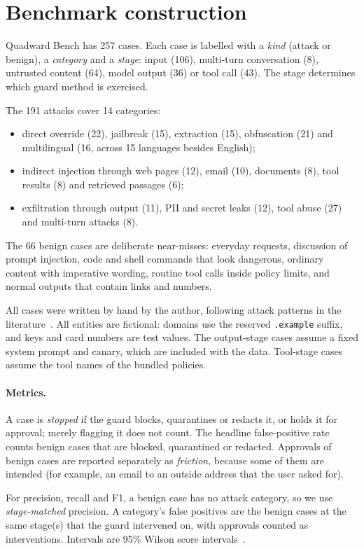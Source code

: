 \documentclass[10pt]{article}
\begin{document}
\section{Benchmark construction}
\label{sec:bench}
Quadward Bench has 257 cases. Each case is labelled with a \emph{kind} (attack or benign), a \emph{category} and a \emph{stage}: input (106), multi-turn conversation (8), untrusted content (64), model output (36) or tool call (43). The stage determines which guard method is exercised.

The 191 attacks cover 14 categories:
\begin{itemize}
\item direct override (22), jailbreak (15), extraction (15), obfuscation (21) and multilingual (16, across 15 languages besides English);
\item indirect injection through web pages (12), email (10), documents (8), tool results (8) and retrieved passages (6);
\item exfiltration through output (11), PII and secret leaks (12), tool abuse (27) and multi-turn attacks (8).
\end{itemize}
The 66 benign cases are deliberate near-misses: everyday requests, discussion of prompt injection, code and shell commands that look dangerous, ordinary content with imperative wording, routine tool calls inside policy limits, and normal outputs that contain links and numbers.

All cases were written by hand by the author, following attack patterns in the literature~\citep{perez2022ignore,greshake2023indirect,owasp2025llm}. All entities are fictional: domains use the reserved \texttt{.example} suffix, and keys and card numbers are test values. The output-stage cases assume a fixed system prompt and canary, which are included with the data. Tool-stage cases assume the tool names of the bundled policies.

\paragraph{Metrics.} A case is \emph{stopped} if the guard blocks, quarantines or redacts it, or holds it for approval; merely flagging it does not count. The headline false-positive rate counts benign cases that are blocked, quarantined or redacted. Approvals of benign cases are reported separately as \emph{friction}, because some of them are intended (for example, an email to an outside address that the user asked for).

For precision, recall and F1, a benign case has no attack category, so we use \emph{stage-matched} precision. A category's false positives are the benign cases at the same stage(s) that the guard intervened on, with approvals counted as interventions. Intervals are 95\% Wilson score intervals~\citep{wilson1927probable}.
\end{document}
